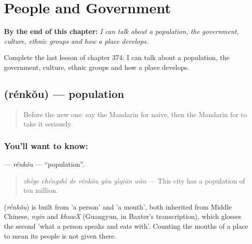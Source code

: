 
\chapter{People and Government}
\label{ch:zh-people-and-government}

\begin{chapteropening}
\textbf{By the end of this chapter:} \emph{I can talk about a population, the government, culture, ethnic groups and how a place develops.}

Complete the last lesson of chapter 374: I can talk about a population, the government, culture, ethnic groups and how a place develops.
\end{chapteropening}

\section[\texorpdfstring{\zh{人口} (rénkǒu)}{人口 (rénkǒu)}]{ (rénkǒu) — population}

\label{lesson:ZH-C374-renkou}



\begin{quote}
Before the new one: say the Mandarin for naive, then the Mandarin for to take it seriously.
\end{quote}

\subsection*{You'll want to know: }
\textbf{} — \emph{rénkǒu} — \textquotedblleft{}population\textquotedblright{}.

\begin{quote}
\emph{zhège chéngshì de rénkǒu yǒu yìqiān wàn} — This city has a population of ten million.
\end{quote}

\begin{cousinweb}
\textbf{} (\emph{rénkǒu}) is built from  'a person' and  'a mouth', both inherited from Middle Chinese, \emph{nyin} and \emph{khuwX} (Guangyun, in Baxter's transcription), which glosses the second 'what a person speaks and eats with'. Counting the mouths of a place to mean its people is not given there.
\end{cousinweb}

